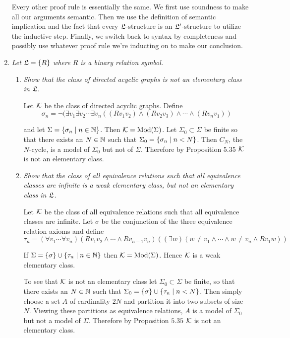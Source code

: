 \documentclass[10pt]{article}
\begin{document}
\begin{enumerate}
Every other proof rule is essentially the same.  We first use soundness to make all our arguments semantic.  Then we use the definition of semantic implication and the fact that every $\L$-structure is an $\L'$-structure to utilize the inductive step.  Finally, we switch back to syntax by completeness and possibly use whatever proof rule we're inducting on to make our conclusion.

\item \emph{Let $\L = \set{R}$ where $R$ is a binary relation symbol.}
\begin{enumerate}
\item \emph{Show that the class of directed acyclic graphs is not an elementary class in $\L$.}

Let $\cal{K}$ be the class of directed acyclic graphs. Define
\[
\sigma_n = \lnot (\exists v_1 \exists v_2 \cdots \exists v_n ((Rv_1v_2) \land (Rv_2v_3) \land \cdots \land (Rv_nv_1))
\]

and let $\Sigma = \set{\sigma_n \mid n \in \N}$.  Then $\cal{K} = \Mod(\Sigma)$.  Let $\Sigma_0 \subset \Sigma$ be finite so that there exists an $N \in \N$ such that $\Sigma_0 = \set{\sigma_n \mid n < N}$.  Then $C_N$, the $N$-cycle, is a model of $\Sigma_0$ but not of $\Sigma$.  Therefore by Proposition $5.35$ $\cal{K}$ is not an elementary class.

\item \emph{Show that the class of all equivalence relations such that all equivalence classes are infinite is a weak elementary class, but not an elementary class in $\L$.}

Let $\cal{K}$ be the class of all equivalence relations such that all equivalence classes are infinite.  Let $\sigma$ be the conjunction of the three equivalence relation axioms and define
\[
\tau_n = (\forall v_1 \cdots \forall v_n)(Rv_1v_2 \land \cdots \land Rv_{n-1}v_n)((\exists w)(w \neq v_1 \land \cdots \land w \neq v_n \land Rv_1w))
\]

If $\Sigma = \set{\sigma} \cup \set{\tau_n \mid n \in \N}$ then $\cal{K} = \Mod(\Sigma)$.  Hence $\cal{K}$ is a weak elementary class.

To see that $\cal{K}$ is not an elementary class let $\Sigma_0 \subset \Sigma$ be finite, so that there exists an $N \in \N$ such that $\Sigma_0 = \set{\sigma} \cup \set{\tau_n \mid n < N}$.  Then simply choose a set $A$ of cardinality $2N$ and partition it into two subsets of size $N$.  Viewing these partitions as equivalence relations, $A$ is a model of $\Sigma_0$ but not a model of $\Sigma$.  Therefore by Proposition $5.35$ $\cal{K}$ is not an elementary class.



\end{enumerate}
\end{enumerate}
\end{document}
